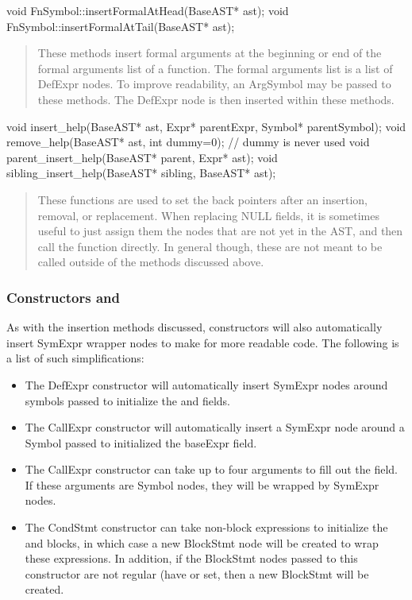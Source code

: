 \documentclass[10pt]{article}
\begin{document}
\begin{clang}
void FnSymbol::insertFormalAtHead(BaseAST* ast);
void FnSymbol::insertFormalAtTail(BaseAST* ast);
\end{clang}
\begin{quote}
These methods insert formal arguments at the beginning or end of the
formal arguments list of a function.  The formal arguments list is a
list of DefExpr nodes.  To improve readability, an ArgSymbol may be
passed to these methods.  The DefExpr node is then inserted within
these methods.
\end{quote}

\begin{clang}
void insert_help(BaseAST* ast, Expr* parentExpr, Symbol* parentSymbol);
void remove_help(BaseAST* ast, int dummy=0); // dummy is never used
void parent_insert_help(BaseAST* parent, Expr* ast);
void sibling_insert_help(BaseAST* sibling, BaseAST* ast);
\end{clang}
\begin{quote}
These functions are used to set the back pointers after an insertion,
removal, or replacement.  When replacing NULL fields, it is sometimes
useful to just assign them the nodes that are not yet in the AST, and
then call the  function directly.  In general though,
these are not meant to be called outside of the methods discussed
above.
\end{quote}

\subsubsection{Constructors and }
\label{sec:constructors}

As with the insertion methods discussed, constructors will also
automatically insert SymExpr wrapper nodes to make for more readable
code.  The following is a list of such simplifications:
\begin{itemize}
\item The DefExpr constructor will automatically insert SymExpr nodes
  around symbols passed to initialize the  and 
  fields.
\item The CallExpr constructor will automatically insert a SymExpr
  node around a Symbol passed to initialized the baseExpr field.
\item The CallExpr constructor can take up to four arguments to fill
  out the  field.  If these arguments are Symbol nodes,
  they will be wrapped by SymExpr nodes.
\item The CondStmt constructor can take non-block expressions to
  initialize the  and  blocks, in which case
  a new BlockStmt node will be created to wrap these expressions.  In
  addition, if the BlockStmt nodes passed to this constructor are not
  regular (have  or  set, then a new
  BlockStmt will be created.
\end{itemize}
\end{document}
